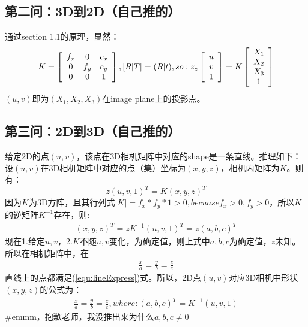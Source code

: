 \documentclass[UTF8]{ctexart}
\begin{document}
\subsection{第二问：3D到2D（自己推的）}
通过section 1.1的原理，显然：
\begin{align*}
K = \left [ \begin{array}{ c c c}
f_x & 0   & c_x \\
0  & f_y & c_y \\
0  & 0   & 1 \\
\end{array} \right ],
[R|T]=(R|t), so:
 z_c \left[ \begin{array}{c}  u \\ v \\ 1 \end{array} \right] =
 K \left[ \begin{array}{c}   X_1 \\  X_2 \\  X_3 \\ 1  \end{array}\right]
\end{align*}
$(u,v)$即为$(X_1,X_2,X_3)$在image plane上的投影点。
\subsection{第三问：2D到3D（自己推的）}
给定2D的点$(u,v)$，该点在3D相机矩阵中对应的shape是一条直线。推理如下：
设$(u,v)$在3D相机矩阵中对应的点（集）坐标为$(x,y,z)$，相机内矩阵为$K$。则有：
$$z(u,v,1)^T=K(x,y,z)^T$$
因为$K$为3D方阵，且其行列式$|K|=f_x*f_y*1>0, becuase f_x>0, f_y>0$，所以$K$的逆矩阵$K^{-1}$存在，则:
\begin{align}
(x,y,z)^T=zK^{-1}(u,v,1)^T=z(a,b,c)^T\label{equ:lineExpress}
\end{align}
现在1.给定$u,v$，2.$K$不随$u,v$变化，为确定值，则上式中$a,b,c$为确定值，$z$未知。所以在相机矩阵中，在
\begin{align}
\frac{x}{a}=\frac{y}{b}=\frac{z}{c}
\end{align}
直线上的点都满足(\ref{equ:lineExpress})式。所以，2D点$(u,v)$对应3D相机中形状$(x,y,z)$的公式为：
\begin{align}
\frac{x}{a}=\frac{y}{b}=\frac{z}{c},where:(a,b,c)^T=K^{-1}(u,v,1)\label{formula:pixel2camera3D}
\end{align}
\#emmm，抱歉老师，我没推出来为什么$a,b,c\neq0$
\end{document}
